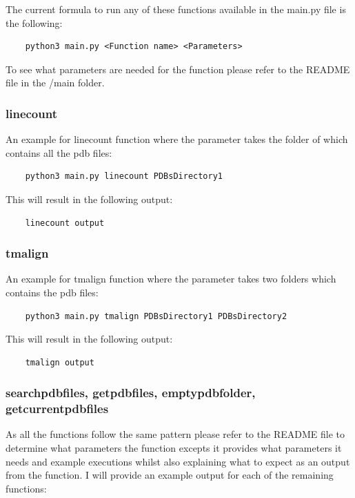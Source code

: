 \documentclass[]{final_report}
\begin{document}
The current formula to run any of these functions available in the main.py file is the following:

\begin{lstlisting}
    python3 main.py <Function name> <Parameters>
\end{lstlisting}
To see what parameters are needed for the function please refer to the README file in the /main folder.

\subsubsection{linecount}
An example for linecount function where the parameter takes the folder of which contains all the pdb files:

\begin{lstlisting}
    python3 main.py linecount PDBsDirectory1
\end{lstlisting}

This will result in the following output:

\begin{lstlisting}
    linecount output
\end{lstlisting}

\subsubsection{tmalign}
An example for tmalign function where the parameter takes two folders which contains the pdb files:

\begin{lstlisting}
    python3 main.py tmalign PDBsDirectory1 PDBsDirectory2
\end{lstlisting}

This will result in the following output:

\begin{lstlisting}
    tmalign output
\end{lstlisting}

\subsubsection{searchpdbfiles, getpdbfiles, emptypdbfolder, getcurrentpdbfiles}

As all the functions follow the same pattern please refer to the README file to determine what parameters the function excepts it provides what parameters it needs and example executions whilst also explaining what to expect as an output from the function. I will provide an example output for each of the remaining functions:
\end{document}
